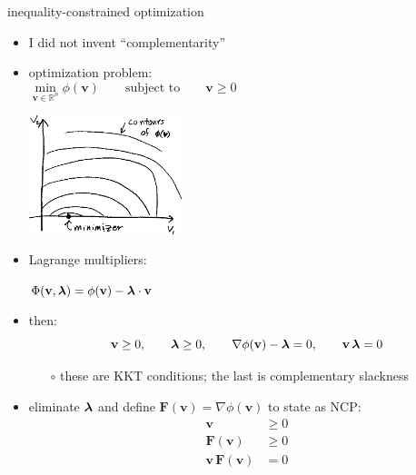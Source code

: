 \documentclass[10pt,hyperref,dvipsnames]{beamer}
\newcommand{\bv}{\mathbf{v}}
\newcommand{\bF}{\mathbf{F}}
\newcommand{\grad}{\nabla}
\newcommand{\RR}{\mathbb{R}}
\begin{document}
\begin{frame}{inequality-constrained optimization}
\begin{itemize}
\item I did not invent ``complementarity''
\item optimization problem:
    $$\min_{\bv\in\RR^n} \phi(\bv) \qquad \text{subject to} \qquad \bv \ge 0 \phantom{sd ad adsaf jsdlkja asdf kj asdf asdfa ad sdfa sad}$$

\vspace{-20mm}
\hfill \includegraphics[width=0.35\textwidth]{figs/optimization.png}

\vspace{-8mm}
\item Lagrange multipliers:

\smallskip
\qquad $\Phi(\bv,\blambda) = \phi(\bv) - \blambda \cdot \bv$
\item then:
    $$\bv \ge 0, \qquad \blambda \ge 0, \qquad \grad \phi(\bv) - \blambda = 0, \qquad \bv\, \blambda = 0$$

    \begin{itemize}
    \item[$\circ$] these are KKT conditions; the last is \alert{complementary slackness}
    \end{itemize}
\item eliminate $\bm{\lambda}$ and define $\bF(\bv) = \grad \phi(\bv)$ to state as NCP:
\begin{align*}
\bv &\ge 0 \\
\bF(\bv) &\ge 0 \\
\bv\, \bF(\bv) &= 0
\end{align*}
\end{itemize}
\end{frame}
\end{document}
